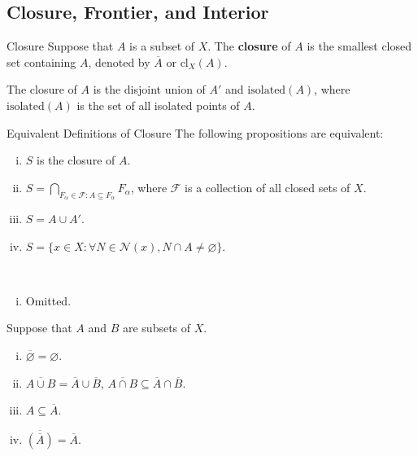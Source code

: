 \documentclass{report}
\begin{document}
\subsection{Closure, Frontier, and Interior}

\begin{definition}{Closure}{}
	Suppose that $A$ is a subset of $X$. The \textbf{closure} of $A$ is the smallest closed set containing $A$, denoted by $\overline{A}$ or $\mathrm{cl}_X(A)$.
\end{definition}

The closure of $A$ is the disjoint union of $A'$ and $\mathrm{isolated}(A)$, where $\mathrm{isolated}(A)$ is the set of all isolated points of $A$.

\begin{proposition}{Equivalent Definitions of Closure}{}
	The following propositions are equivalent:
	\begin{enumerate}[(i)]
		\item $S$ is the closure of $A$.
		\item $S=\bigcap\limits_{F_\alpha\in\mathcal{F}:A\subseteq F_\alpha}F_\alpha$, where $\mathcal{F}$ is a collection of all closed sets of $X$.
		\item $S=A\cup A'$.
		\item $S=\{x\in X: \forall N\in\mathcal{N}(x),N\cap A\ne\varnothing\}$.
	\end{enumerate}
\end{proposition}


\begin{prf}~\\ \vspace{-1em}
	\begin{enumerate}[(i)]
		\item Omitted.
	\end{enumerate}
\end{prf}

\begin{proposition}{}{}
	Suppose that $A$ and $B$ are subsets of $X$.
	\begin{enumerate}[(i)]
		\item $\overline{\varnothing}=\varnothing$.
		\item $\overline{A \cup B}=\overline{A}\cup\overline{B}$,  $\overline{A \cap B}\subseteq \overline{A}\cap\overline{B}$.
		\item $A\subseteq \overline{A}$.
		\item $\overline{\left(\overline{A}\right)}=\overline{A}$.
	\end{enumerate}
\end{proposition}
\end{document}
